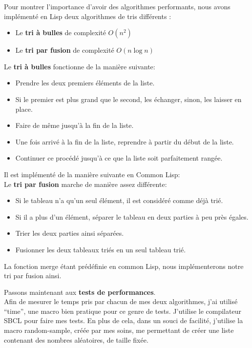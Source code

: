 \documentclass[a4paper, 12pt]{article}
\numberwithin{equation}{subsection}
\begin{document}
Pour montrer l'importance d'avoir des algorithmes performants, nous avons implémenté en Lisp deux algorithmes de tris différents : \\[0.2cm]
\begin{itemize}
  \item Le {\bf tri à bulles} de complexité {\bf $O(n^{2})$}
  \item Le {\bf tri par fusion} de complexité {\bf $O(n\log{n})$}\\
\end{itemize}
Le {\bf tri à bulles} fonctionne de la manière suivante:
\begin{itemize}
  \item Prendre les deux premiers éléments de la liste.
  \item Si le premier est plus grand que le second, les échanger, sinon, les laisser en place.
  \item Faire de même jusqu'à la fin de la liste.
  \item Une fois arrivé à la fin de la liste, reprendre à partir du début de la liste.
  \item Continuer ce procédé jusqu'à ce que la liste soit parfaitement rangée.\\[0.2cm]
\end{itemize}
Il est implémenté de la manière suivante en Common Lisp: \\[0.2cm]

Le {\bf tri par fusion} marche de manière assez différente:
\begin{itemize}
  \item Si le tableau n'a qu'un seul élément, il est considéré comme déjà trié.
  \item Si il a plus d'un élément, séparer le tableau en deux parties à peu près égales.
  \item Trier les deux parties ainsi séparées.
  \item Fusionner les deux tableaux triés en un seul tableau trié. \\[0.2cm]
\end{itemize}
La fonction merge étant prédéfinie en common Lisp, nous implémenterons notre tri par fusion ainsi.

Passons maintenant aux {\bf tests de performances}. \\

Afin de mesurer le temps pris par chacun de mes deux algorithmes, j'ai utilisé ``time'', une macro bien pratique pour ce genre de tests. J'utilise le compilateur SBCL pour faire mes tests. En plus de cela, dans un souci de facilité, j'utilise la macro random-sample, créée par mes soins, me permettant de créer une liste contenant des nombres aléatoires, de taille fixée. \\
\end{document}
